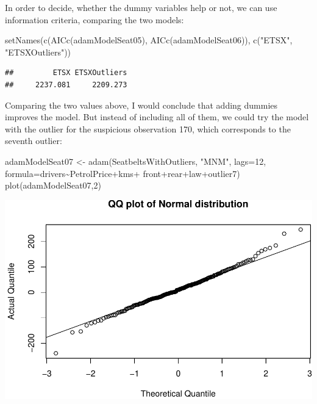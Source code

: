 \documentclass[
]{book}
\newenvironment{Shaded}{\begin{snugshade}}{\end{snugshade}}
\newcommand{\AttributeTok}[1]{\textcolor[rgb]{0.77,0.63,0.00}{#1}}
\newcommand{\DecValTok}[1]{\textcolor[rgb]{0.00,0.00,0.81}{#1}}
\newcommand{\FunctionTok}[1]{\textcolor[rgb]{0.00,0.00,0.00}{#1}}
\newcommand{\NormalTok}[1]{#1}
\newcommand{\OtherTok}[1]{\textcolor[rgb]{0.56,0.35,0.01}{#1}}
\newcommand{\SpecialCharTok}[1]{\textcolor[rgb]{0.00,0.00,0.00}{#1}}
\newcommand{\StringTok}[1]{\textcolor[rgb]{0.31,0.60,0.02}{#1}}
\theoremstyle{definition}
\theoremstyle{definition}
\theoremstyle{definition}
\theoremstyle{definition}
\theoremstyle{remark}
\begin{document}
In order to decide, whether the dummy variables help or not, we can use information criteria, comparing the two models:

\begin{Shaded}
\begin{Highlighting}[]
\FunctionTok{setNames}\NormalTok{(}\FunctionTok{c}\NormalTok{(}\FunctionTok{AICc}\NormalTok{(adamModelSeat05), }\FunctionTok{AICc}\NormalTok{(adamModelSeat06)),}
         \FunctionTok{c}\NormalTok{(}\StringTok{"ETSX"}\NormalTok{, }\StringTok{"ETSXOutliers"}\NormalTok{))}
\end{Highlighting}
\end{Shaded}

\begin{verbatim}
##         ETSX ETSXOutliers 
##     2237.081     2209.273
\end{verbatim}

Comparing the two values above, I would conclude that adding dummies improves the model. But instead of including all of them, we could try the model with the outlier for the suspicious observation 170, which corresponds to the seventh outlier:

\begin{Shaded}
\begin{Highlighting}[]
\NormalTok{adamModelSeat07 }\OtherTok{\textless{}{-}} \FunctionTok{adam}\NormalTok{(SeatbeltsWithOutliers, }\StringTok{"MNM"}\NormalTok{, }\AttributeTok{lags=}\DecValTok{12}\NormalTok{,}
                        \AttributeTok{formula=}\NormalTok{drivers}\SpecialCharTok{\textasciitilde{}}\NormalTok{PetrolPrice}\SpecialCharTok{+}\NormalTok{kms}\SpecialCharTok{+}
\NormalTok{                          front}\SpecialCharTok{+}\NormalTok{rear}\SpecialCharTok{+}\NormalTok{law}\SpecialCharTok{+}\NormalTok{outlier7)}
\FunctionTok{plot}\NormalTok{(adamModelSeat07,}\DecValTok{2}\NormalTok{)}
\end{Highlighting}
\end{Shaded}

\includegraphics{adam_files/figure-latex/unnamed-chunk-142-1.pdf}
\end{document}
